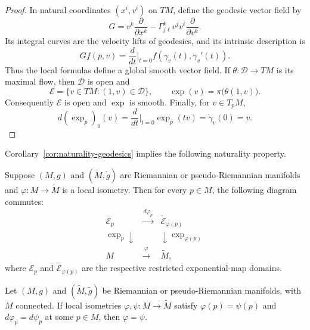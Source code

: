 \begin{proposition}
\begin{proof}
In natural coordinates $(x^i,v^i)$ on $TM$, define the geodesic vector field
by
\[
G=v^k\frac{\partial}{\partial x^k}
-\Gamma^k_{j\ell}v^jv^\ell\frac{\partial}{\partial v^k}.
\]
Its integral curves are the velocity lifts of geodesics, and its intrinsic
description is
\begin{equation}
Gf(p,v) = \frac{d}{dt}\bigg|_{t=0}
f(\gamma_v(t), \gamma_v'(t)). \tag{5.18}
\end{equation}
Thus the local formulas define a global smooth vector field.  If
$\theta:\mathcal D\to TM$ is its maximal flow, then $\mathcal D$ is open and
\[
\mathcal E=\{v\in TM:(1,v)\in\mathcal D\},
\qquad
\exp(v)=\pi\bigl(\theta(1,v)\bigr).
\]
Consequently $\mathcal E$ is open and $\exp$ is smooth.  Finally, for
$v\in T_pM$,
\[
d(\exp_p)_0(v)
=\frac{d}{dt}\bigg|_{t=0}\exp_p(tv)
=\dot\gamma_v(0)=v.
\]
\end{proof}
\end{proposition}

Corollary~\ref{cor:naturality-geodesics} implies the following naturality
property.

\begin{proposition}
\label{prop:naturality-exponential-map}


Suppose $(M,g)$ and $(\tilde{M},\tilde{g})$ are Riemannian or
pseudo-Riemannian manifolds and $\varphi: M \to \tilde{M}$ is a local
isometry. Then for every $p \in M$, the following diagram commutes:
\[
\begin{array}{ccc}
\mathcal{E}_p & \xrightarrow{\ d\varphi_p\ } & \tilde{\mathcal{E}}_{\varphi(p)} \\
{\scriptstyle \exp_p}\downarrow & & \downarrow{\scriptstyle \exp_{\varphi(p)}} \\
M & \xrightarrow{\ \varphi\ } & \tilde{M},
\end{array}
\]
where $\mathcal E_p$ and $\widetilde{\mathcal E}_{\varphi(p)}$ are the
respective restricted exponential-map domains.
\end{proposition}

\begin{proposition}
\label{prop:local-isometries-completely-determined}
Let $(M, g)$ and $(\tilde{M}, \tilde{g})$ be Riemannian or
pseudo-Riemannian manifolds, with $M$ connected. If local isometries
$\varphi, \psi: M \to \tilde{M}$ satisfy
$\varphi(p) = \psi(p)$ and $d\varphi_p = d\psi_p$ at some $p\in M$, then
$\varphi = \psi$.
\end{proposition}

